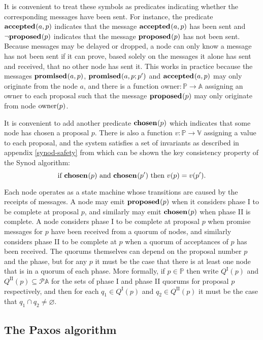 \documentclass[journal]{IEEEtran}
\begin{document}
It is convenient to treat these symbols as predicates indicating whether the
corresponding messages have been sent. For instance, the predicate
$\mathbf{accepted}_{}(a,p)$ indicates that the message $\mathbf{accepted}_{}(a,p)$ has been sent and
$\neg \mathbf{proposed}_{}(p)$ indicates that the message $\mathbf{proposed}_{}(p)$ has not been sent.
Because messages may be delayed or dropped, a node can only know a message has
not been sent if it can prove, based solely on the messages it alone has sent
and received, that no other node has sent it. This works in practice because
the messages $\mathbf{promised}_{}(a,p)$, $\mathbf{promised}_{}(a,p;p')$ and $\mathbf{accepted}_{}(a,p)$ may only
originate from the node $a$, and there is a function $\mathrm{owner} : \mathbb
P \to \mathbb A$ assigning an owner to each proposal such that the message
$\mathbf{proposed}_{}(p)$ may only originate from node $\mathrm{owner}(p)$.

It is convenient to add another predicate $\mathbf{chosen}_{}(p)$ which indicates that
some node has chosen a proposal $p$. There is also a function $v : \mathbb P
\to \mathbb V$ assigning a value to each proposal, and the system satisfies a
set of invariants as described in appendix \ref{synod-safety} from which can be
shown the key consistency property of the Synod algorithm: \[\textrm{if }
\mathbf{chosen}_{}(p) \textrm{ and } \mathbf{chosen}_{}(p') \textrm { then } v(p) = v(p').\]

Each node operates as a state machine whose transitions are caused by the
receipts of messages. A node may emit $\mathbf{proposed}_{}(p)$ when it considers phase I to
be complete at proposal $p$, and similarly may emit $\mathbf{chosen}_{}(p)$ when phase
II is complete.  A node considers phase I to be complete at proposal $p$ when
promise messages for $p$ have been received from a quorum of nodes, and
similarly considers phase II to be complete at $p$ when a quorum of acceptances
of $p$ has been received. The quorums themselves can depend on the proposal
number $p$ and the phase, but for any $p$ it must be the case that there is at
least one node that is in a quorum of each phase.  More formally, if $p \in
\mathbb P$ then write $Q^\textrm{I}(p)$ and $Q^\textrm{II}(p) \subseteq
\mathcal P \mathbb A$ for the sets of phase I and phase II quorums for proposal
$p$ respectively, and then for each $q_1 \in Q^\textrm{I}(p)$ and $q_2 \in
Q^\textrm{II}(p)$ it must be the case that $q_1 \cap q_2 \ne \varnothing$.

\subsection{The Paxos algorithm}
\end{document}

